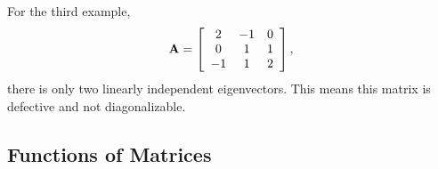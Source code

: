 For the third example, 
\begin{align}
  \mathbf{A} =
  \left[ \begin{array}{c c c}
   2 & -1 &  0 \\
   0 &  1 &  1 \\
  -1 &  1 &  2 \\ \end{array} \right] , \nonumber
\end{align}
there is only two linearly independent eigenvectors. This means this matrix is defective and not diagonalizable.

\subsection{Functions of Matrices}

